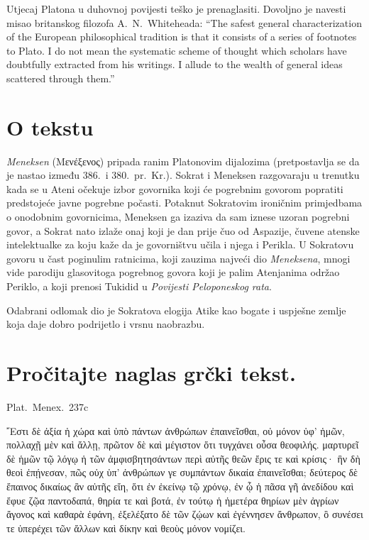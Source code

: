 Utjecaj Platona u duhovnoj povijesti teško je prenaglasiti. Dovoljno je navesti misao britanskog filozofa A.~N.\ Whiteheada: “The safest general characterization of the European philosophical tradition is that it consists of a series of footnotes to Plato. I do not mean the systematic scheme of thought which scholars have doubtfully extracted from his writings. I allude to the wealth of general ideas scattered through them.”

\section*{O tekstu}

\textit{Meneksen} \textgreek[variant=ancient]{(Μενέξενος)} pripada ranim Platonovim dijalozima (pretpostavlja se da je nastao između 386.\ i 380.\ pr.~Kr.). Sokrat i Meneksen razgovaraju u trenutku kada se u Ateni očekuje izbor govornika koji će pogrebnim govorom popratiti predstojeće javne pogrebne počasti. Potaknut Sokratovim ironičnim primjedbama o onodobnim govornicima, Meneksen ga izaziva da sam iznese uzoran pogrebni govor, a Sokrat nato izlaže onaj koji je dan prije čuo od Aspazije, čuvene atenske intelektualke za koju kaže da je govorništvu učila i njega i Perikla. U Sokratovu govoru u čast poginulim ratnicima, koji zauzima najveći dio \textit{Meneksena}, mnogi vide parodiju glasovitoga pogrebnog govora koji je palim Atenjanima održao Periklo, a koji prenosi Tukidid u \textit{Povijesti Peloponeskog rata}. 

Odabrani odlomak dio je Sokratova elogija Atike kao bogate i uspješne zemlje koja daje dobro podrijetlo i vrsnu naobrazbu.


\section*{Pročitajte naglas grčki tekst.}

Plat.\ Menex.\ 237c

\medskip

{\large
\begin{greek}
῎Εστι δὲ ἀξία ἡ χώρα καὶ ὑπὸ πάντων ἀνθρώπων ἐπαινεῖσθαι, οὐ μόνον ὑφ' ἡμῶν, πολλαχῇ μὲν καὶ ἄλλῃ, πρῶτον δὲ καὶ μέγιστον ὅτι τυγχάνει οὖσα θεοφιλής. μαρτυρεῖ δὲ ἡμῶν τῷ λόγῳ ἡ τῶν ἀμφισβητησάντων περὶ αὐτῆς θεῶν ἔρις τε καὶ κρίσις· ἣν δὴ θεοὶ ἐπῄνεσαν, πῶς οὐχ ὑπ' ἀνθρώπων γε συμπάντων δικαία ἐπαινεῖσθαι; δεύτερος δὲ ἔπαινος δικαίως ἂν αὐτῆς εἴη, ὅτι ἐν ἐκείνῳ τῷ χρόνῳ, ἐν ᾧ ἡ πᾶσα γῆ ἀνεδίδου καὶ ἔφυε ζῷα παντοδαπά, θηρία τε καὶ βοτά, ἐν τούτῳ ἡ ἡμετέρα θηρίων μὲν ἀγρίων ἄγονος καὶ καθαρὰ ἐφάνη, ἐξελέξατο δὲ τῶν ζῴων καὶ ἐγέννησεν ἄνθρωπον, ὃ συνέσει τε ὑπερέχει τῶν ἄλλων καὶ δίκην καὶ θεοὺς μόνον νομίζει.
\end{greek}

}

